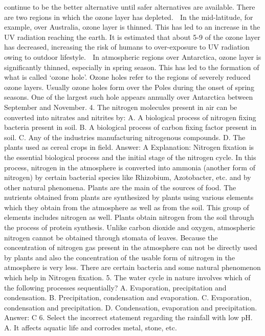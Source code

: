continue to be the better alternative until safer alternatives are
available.
There are two regions in which the ozone layer has depleted.
 In the mid-latitude, for example, over Australia, ozone layer is
thinned. This has led to an increase in the UV radiation
reaching the earth. It is estimated that about 5-9%
of the ozone layer has decreased, increasing the risk of
humans to over-exposure to UV radiation owing to outdoor
lifestyle.
 In atmospheric regions over Antarctica, ozone layer is
significantly thinned, especially in spring season. This has led to
the formation of what is called ‘ozone hole’. Ozone holes refer
to the regions of severely reduced ozone layers. Usually ozone
holes form over the Poles during the onset of spring seasons.
One of the largest such hole appears annually over Antarctica
between September and November.
4. The nitrogen molecules present in air can be converted into
nitrates and nitrites by:
A. A biological process of nitrogen fixing bacteria present in soil.
B. A biological process of carbon fixing factor present in soil.
C. Any of the industries manufacturing nitrogenous compounds.
D. The plants used as cereal crops in field.
Answer: A
Explanation: Nitrogen fixation is the essential biological process and
the initial stage of the nitrogen cycle. In this process, nitrogen in
the atmosphere is converted into ammonia (another form of
nitrogen) by certain bacterial species like Rhizobium, Azotobacter,
etc. and by other natural phenomena.
Plants are the main of the sources of food. The nutrients obtained
from plants are synthesized by plants using various elements which
they obtain from the atmosphere as well as from the soil. This group
of elements includes nitrogen as well. Plants obtain nitrogen from
the soil through the process of protein synthesis. Unlike carbon
dioxide and oxygen, atmospheric nitrogen cannot be obtained
through stomata of leaves. Because the concentration of nitrogen
gas present in the atmosphere can not be directly used by plants and
also the concentration of the usable form of nitrogen in the
atmosphere is very less. There are certain bacteria and some natural
phenomenon which help in Nitrogen fixation.
5. The water cycle in nature involves which of the following
processes sequentially?
A. Evaporation, precipitation and condensation.
B. Precipitation, condensation and evaporation.
C. Evaporation, condensation and precipitation.
D. Condensation, evaporation and precipitation.
Answer: C
6. Select the incorrect statement regarding the rainfall with low
pH.
A. It affects aquatic life and corrodes metal, stone, etc.
